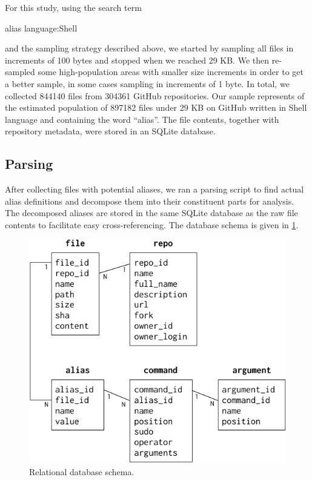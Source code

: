 For this study, using the search term
\begin{CVerbatim}
alias language:Shell
\end{CVerbatim}
and the sampling strategy described above, we started by sampling all files in increments of 100 bytes and stopped when we reached 29 KB.
We then re-sampled some high-population areas with smaller size increments in order to get a better sample, in some cases sampling in increments of 1 byte.
In total, we collected \num{844140} files from \num{304361} GitHub repositories.
Our sample represents  of the estimated population of \num{897182} files under 29 KB on GitHub written in Shell language and containing the word ``alias''.
The file contents, together with repository metadata, were stored in an SQLite database.

\subsection{Parsing}

After collecting files with potential aliases, we ran a parsing script to find actual alias definitions and decompose them into their constituent parts for analysis.
The decomposed aliases are stored in the same SQLite database as the raw file contents to facilitate easy cross-referencing.
The database schema is given in \cref{fig:schema}.

\begin{figure}
    \centering
    \includegraphics[width=0.9\columnwidth]{schema.pdf}
    \caption{Relational database schema.}
    \label{fig:schema}
\end{figure}

